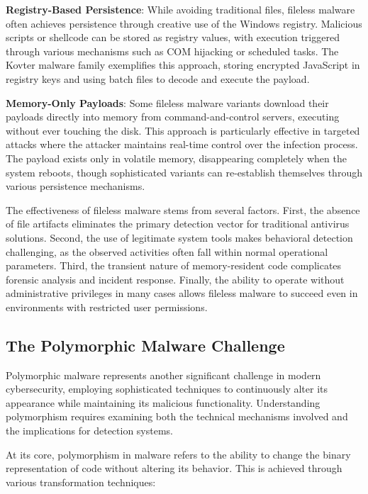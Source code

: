 \textbf{Registry-Based Persistence}: While avoiding traditional files, fileless malware often achieves persistence through creative use of the Windows registry. Malicious scripts or shellcode can be stored as registry values, with execution triggered through various mechanisms such as COM hijacking or scheduled tasks. The Kovter malware family exemplifies this approach, storing encrypted JavaScript in registry keys and using batch files to decode and execute the payload.

\textbf{Memory-Only Payloads}: Some fileless malware variants download their payloads directly into memory from command-and-control servers, executing without ever touching the disk. This approach is particularly effective in targeted attacks where the attacker maintains real-time control over the infection process. The payload exists only in volatile memory, disappearing completely when the system reboots, though sophisticated variants can re-establish themselves through various persistence mechanisms.

The effectiveness of fileless malware stems from several factors. First, the absence of file artifacts eliminates the primary detection vector for traditional antivirus solutions. Second, the use of legitimate system tools makes behavioral detection challenging, as the observed activities often fall within normal operational parameters. Third, the transient nature of memory-resident code complicates forensic analysis and incident response. Finally, the ability to operate without administrative privileges in many cases allows fileless malware to succeed even in environments with restricted user permissions.

\subsection{The Polymorphic Malware Challenge}
\label{subsec:polymorphic_malware}

Polymorphic malware represents another significant challenge in modern cybersecurity, employing sophisticated techniques to continuously alter its appearance while maintaining its malicious functionality. Understanding polymorphism requires examining both the technical mechanisms involved and the implications for detection systems.

At its core, polymorphism in malware refers to the ability to change the binary representation of code without altering its behavior. This is achieved through various transformation techniques:

